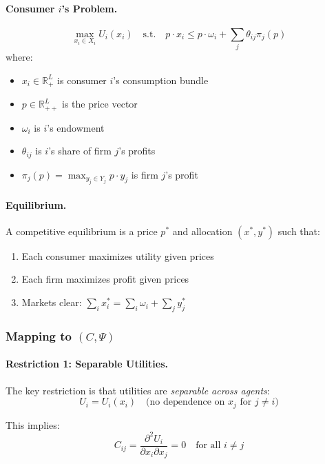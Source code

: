 \paragraph{Consumer $i$'s Problem.}
\begin{equation}
  \max_{x_i \in X_i} U_i(x_i) \quad \text{s.t.} \quad p \cdot x_i \leq p \cdot \omega_i + \sum_j \theta_{ij} \pi_j(p)
\end{equation}
where:
\begin{itemize}
  \item $x_i \in \mathbb{R}^L_+$ is consumer $i$'s consumption bundle
  \item $p \in \mathbb{R}^L_{++}$ is the price vector
  \item $\omega_i$ is $i$'s endowment
  \item $\theta_{ij}$ is $i$'s share of firm $j$'s profits
  \item $\pi_j(p) = \max_{y_j \in Y_j} p \cdot y_j$ is firm $j$'s profit
\end{itemize}

\paragraph{Equilibrium.}
A competitive equilibrium is a price $p^*$ and allocation $(x^*, y^*)$ such that:
\begin{enumerate}
  \item Each consumer maximizes utility given prices
  \item Each firm maximizes profit given prices
  \item Markets clear: $\sum_i x_i^* = \sum_i \omega_i + \sum_j y_j^*$
\end{enumerate}

\subsubsection{Mapping to $(C, \Psi)$}

\paragraph{Restriction 1: Separable Utilities.}
The key restriction is that utilities are \emph{separable across agents}:
\begin{equation}
  U_i = U_i(x_i) \quad \text{(no dependence on } x_j \text{ for } j \neq i \text{)}
\end{equation}

This implies:
\begin{equation}
  C_{ij} = \frac{\partial^2 U_i}{\partial x_i \partial x_j} = 0 
  \quad \text{for all } i \neq j
  \label{eq:adseparability}
\end{equation}

